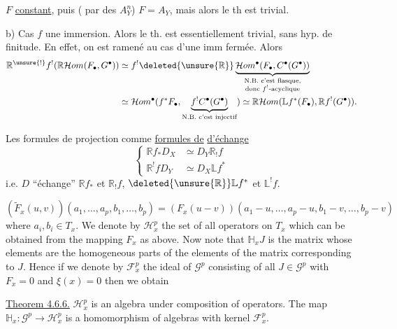  $F$ \uline{constant}, puis ( par des $A_Y^n$) $F=A_Y$, mais alors le th est trivial.

b) Cas $f$ une immersion. Alors le th. est essentiellement trivial, sans hyp. de finitude.
En effet, on est ramené au cas d'une imm fermée. Alors
\[
\begin{aligned}
\mathbb R^{\unsure{!}}f^!(\mathbb R\mathcal Hom(F_\bullet,G^\bullet))
&\simeq f^!\deleted{\unsure{\mathbb R}}\underbrace{\mathcal Hom^\bullet(F_\bullet,C^\bullet(G^\bullet))}_{\substack{\text{N.B. c'est flasque,}\\\text{donc }f^!\text{-acyclique}}}\\
&\simeq \mathcal Hom^\bullet(f^*F_\bullet,\underbrace{f^!C^\bullet(G^\bullet)}_{\text{N.B. c'est injectif}})
\simeq\mathbb R\mathcal Hom(\mathbb Lf^*(F_\bullet),\mathbb R f^!(G^\bullet)).
\end{aligned}
\]


Les formules de projection  comme \uline{formules de}  \uline{d'échange}
\[
\left\{\begin{aligned}
\mathbb Rf_*D_X&\simeq D_Y\mathbb R_!f\\
\mathbb R^!fD_Y&\simeq D_X\mathbb Lf^*
\end{aligned}\right.
\]
i.e. $D$ ``échange'' $\mathbb Rf_*$ et $\mathbb R_!f$, $\deleted{\unsure{\mathbb R}}\mathbb Lf^*$ et $\mathbb L^!f$.

\[
(\widetilde F_x(u,v))(a_1,\ldots,a_p,b_1,\ldots,b_p)=(F_x(u-v))(a_1-u,\ldots,a_p-u,b_1-v,\ldots,b_p-v)
\]
where $a_i,b_i\in T_x$. We denote by $\mathcal H_x^p$ the set of all operators on $T_x$ which can be obtained from the mapping $F_x$ as above. Now note that $\mathbb H_xJ$ is the matrix whose elements are the homogeneous parts of the elements of the matrix corresponding to $J$. Hence if we denote by $\mathcal F_x^p$ the ideal of $\mathcal G^p$ consisting of all $J\in\mathcal G^p$ with $F_x=0$ and $\xi(x)=0$ then we obtain

\uline{Theorem 4.6.6.} $\mathcal H_x^p$ is an algebra under composition of operators. The map $\mathbb H_x:\mathcal G^p\longrightarrow\mathcal H_x^p$ is a homomorphism of algebras with kernel $\mathcal F_x^p$.

